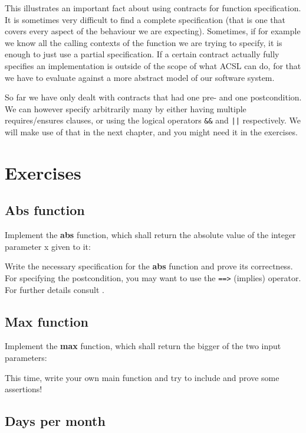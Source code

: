 This illustrates an important fact about using contracts for function specification. It is sometimes very difficult to find a complete specification (that is one that covers every aspect of the behaviour we are expecting). Sometimes, if for example we know all the calling contexts of the function we are trying to specify, it is enough to just use a partial specification. If a certain contract actually fully specifies an implementation is outside of the scope of what ACSL can do, for that we have to evaluate against a more abstract model of our software system.

So far we have only dealt with contracts that had one pre- and one postcondition. We can however specify arbitrarily many by either having multiple requires/ensures clauses, or using the logical operators \texttt{&&} and \texttt{||} respectively. We will make use of that in the next chapter, and you might need it in the exercises. 

\section{Exercises}

\subsection{Abs function}

Implement the \textbf{abs} function, which shall return the absolute value of the integer parameter x given to it:


Write the necessary specification for the \textbf{abs} function and prove its correctness. For specifying the postcondition, you may want to use the \texttt{==>} (implies) operator. For further details consult \cite{baudin_acsl_nodate}. 

\subsection{Max function}

Implement the \textbf{max} function, which shall return the bigger of the two input parameters:


This time, write your own main function and try to include and prove some assertions! 

\subsection{Days per month}

